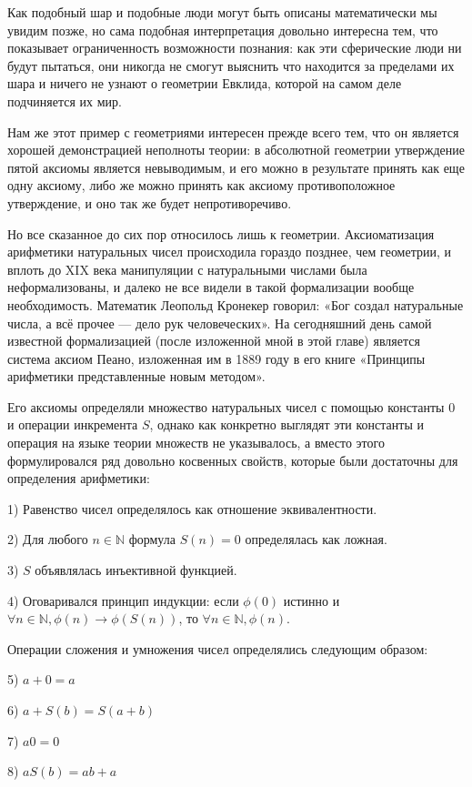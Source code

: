 Как подобный шар и подобные люди могут быть описаны математически мы увидим позже, но сама подобная интерпретация довольно интересна тем, что показывает ограниченность возможности познания: как эти сферические люди ни будут пытаться, они никогда не смогут выяснить что находится за пределами их шара и ничего не узнают о геометрии Евклида, которой на самом деле подчиняется их мир.

Нам же этот пример с геометриями интересен прежде всего тем, что он является хорошей демонстрацией неполноты теории: в абсолютной геометрии утверждение пятой аксиомы является невыводимым, и его можно в результате принять как еще одну аксиому, либо же можно принять как аксиому противоположное утверждение, и оно так же будет непротиворечиво.

Но все сказанное до сих пор относилось лишь к геометрии. Аксиоматизация арифметики натуральных чисел происходила гораздо позднее, чем геометрии, и вплоть до XIX века манипуляции с натуральными числами была неформализованы, и далеко не все видели в такой формализации вообще необходимость. Математик Леопольд Кронекер говорил: «Бог создал натуральные числа, а всё прочее — дело рук человеческих». На сегодняшний день самой известной формализацией (после изложенной мной в этой главе) является система аксиом Пеано, изложенная им в 1889 году в его книге «Принципы арифметики представленные новым методом».

Его аксиомы определяли множество натуральных чисел с помощью константы $0$ и операции инкремента $S$, однако как конкретно выглядят эти константы и операция на языке теории множеств не указывалось, а вместо этого формулировался ряд довольно косвенных свойств, которые были достаточны для определения арифметики:

1) Равенство чисел определялось как отношение эквивалентности.

2) Для любого $n\in\mathbb{N}$ формула $S(n) = 0$ определялась как ложная.

3) $S$ объявлялась инъективной функцией.

4) Оговаривался принцип индукции: если $\phi(0)$ истинно и $\forall n\in\mathbb{N}, \phi(n)\rightarrow \phi(S(n))$, то $\forall n\in\mathbb{N}, \phi(n)$.

Операции сложения и умножения чисел определялись следующим образом:

5) $a+0 = a$

6) $a+S(b) = S(a + b)$

7) $a0 = 0$

8) $aS(b) = ab + a$

